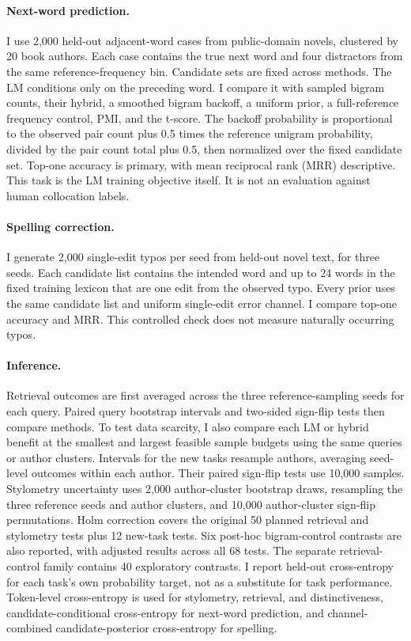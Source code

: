 \documentclass[11pt]{article}
\begin{document}
\paragraph{Next-word prediction.} I use 2,000 held-out adjacent-word cases from
public-domain novels, clustered by 20 book authors. Each case contains the true
next word and four distractors from the same reference-frequency bin.
Candidate sets are fixed across methods. The LM conditions only on the
preceding word. I compare it with sampled bigram counts, their hybrid, a
smoothed bigram backoff, a uniform prior, a full-reference frequency control,
PMI, and the t-score. The backoff probability is proportional to the observed
pair count plus 0.5 times the reference unigram probability, divided by the
pair count total plus 0.5, then normalized over the fixed candidate set.
Top-one accuracy is primary, with mean reciprocal rank (MRR) descriptive. This
task is the LM training objective itself. It is not an evaluation against human
collocation labels.

\paragraph{Spelling correction.} I generate 2,000 single-edit typos per seed
from held-out novel text, for three seeds. Each candidate list contains the
intended word and up to 24 words in the fixed training lexicon that are one
edit from the observed typo. Every prior uses the same candidate list and
uniform single-edit error channel. I compare top-one accuracy and MRR. This
controlled check does not measure naturally occurring typos.

\paragraph{Inference.} Retrieval outcomes are first averaged across the three
reference-sampling seeds for each query. Paired query bootstrap intervals and
two-sided sign-flip tests then compare methods. To test data scarcity, I also
compare each LM or hybrid benefit at the smallest and largest feasible sample
budgets using the same queries or author clusters. Intervals for the new tasks
resample authors, averaging seed-level outcomes within each author. Their
paired sign-flip tests use 10,000 samples. Stylometry uncertainty uses 2,000
author-cluster bootstrap draws, resampling the three reference seeds and author
clusters, and 10,000 author-cluster sign-flip permutations. Holm correction
covers the original 50 planned retrieval and stylometry tests plus 12 new-task
tests. Six post-hoc bigram-control contrasts are also reported, with adjusted
results across all 68 tests. The separate retrieval-control family contains 40
exploratory contrasts. I report held-out cross-entropy for each task's own
probability target, not as a substitute for task performance. Token-level
cross-entropy is used for stylometry, retrieval, and distinctiveness,
candidate-conditional cross-entropy for next-word prediction, and
channel-combined candidate-posterior cross-entropy for spelling.
\end{document}
